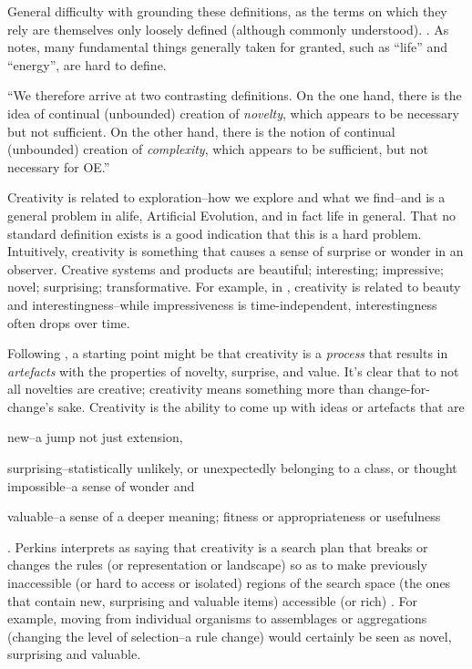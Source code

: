 \begin{DRAFT}
General difficulty with grounding these definitions, as the terms on which they rely are themselves only loosely defined (although commonly understood). \parencite{BanzhafBaumgaertnerBeslonEtAl2016}. As \textcite{Gayon2010} notes, many fundamental things generally taken for granted, such as ``life'' and ``energy'', are hard to define. 

``We therefore arrive at two contrasting definitions. On the one hand, there is the idea of continual (unbounded) creation of \emph{novelty}, which appears to be necessary but not sufficient. On the other hand, there is the notion of continual (unbounded) creation of \emph{complexity}, which appears to be sufficient, but not necessary for OE.'' \parencite{BanzhafBaumgaertnerBeslonEtAl2016}
\end{DRAFT}

Creativity is related to exploration--how we explore and what we find--and is a general problem in \gls{alife}, Artificial Evolution, and in fact life in general. That no standard definition exists is a good indication that this is a hard problem. Intuitively, creativity is something that causes a sense of surprise or wonder in an observer. Creative systems and products are beautiful; interesting; impressive; novel; surprising; transformative.  For example, in \textcite{Lehman2012}, creativity is related to beauty and interestingness--while impressiveness is time-independent, interestingness often drops over time.

Following \textcite{Boden2004}, a starting point might be that creativity is a \emph{process} that results in \emph{artefacts} with the properties of novelty, surprise, and value. It's clear that to \textcite{Boden2004} not all novelties are creative; creativity means something more than change-for-change's sake. Creativity is the ability to come up with ideas or artefacts that are \begin{inparaenum}[1)]\item new--a jump not just extension,\item surprising--statistically unlikely, or unexpectedly belonging to a class, or thought impossible--a sense of wonder and \item valuable--a sense of a deeper meaning; fitness or appropriateness or usefulness \end{inparaenum}\parencite{Boden2004}. Perkins interprets \textcite{Boden2004} as saying that creativity is a search plan that breaks or changes the rules (or representation or landscape) so as to make previously inaccessible (or hard to access or isolated) regions of the search space (the ones that contain new, surprising and valuable items) accessible (or rich) \parencite{Perkins1995}. For example, moving from individual organisms to assemblages or aggregations (changing the level of selection--a rule change) would certainly be seen as novel, surprising and valuable.


